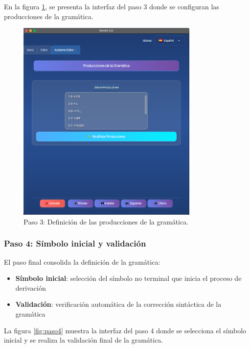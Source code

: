 En la figura \ref{fig:paso3}, se presenta la interfaz del paso 3 donde se configuran las producciones de la gramática.

\needspace{6cm}
\begin{figure}[H]
\centering
\includegraphics[width=0.8\textwidth]{figuras2/editor/paso3_producciones.png}
\caption{Paso 3: Definición de las producciones de la gramática.}
\label{fig:paso3}
\end{figure}

\subsubsection{Paso 4: Símbolo inicial y validación}

El paso final consolida la definición de la gramática:
\begin{itemize}
 \item \textbf{Símbolo inicial}: selección del símbolo no terminal que inicia el proceso de derivación
 \item \textbf{Validación}: verificación automática de la corrección sintáctica de la gramática
\end{itemize}

La figura \ref{fig:paso4} muestra la interfaz del paso 4 donde se selecciona el símbolo inicial y se realiza la validación final de la gramática.

